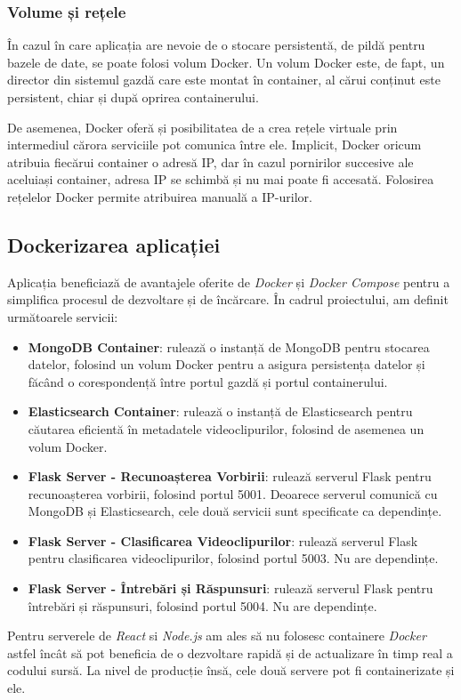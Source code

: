 \subsubsection{Volume și rețele}
\par
În cazul în care aplicația are nevoie de o stocare persistentă, de pildă pentru bazele de date, se poate
folosi volum Docker. Un volum Docker este, de fapt, un director din sistemul gazdă care este montat în
container, al cărui conținut este persistent, chiar și după oprirea containerului.

\par
De asemenea, Docker oferă și posibilitatea de a crea rețele virtuale prin intermediul cărora serviciile
pot comunica între ele. Implicit, Docker oricum atribuia fiecărui container o adresă IP, dar în cazul
pornirilor succesive ale aceluiași container, adresa IP se schimbă și nu mai poate fi accesată. Folosirea
rețelelor Docker permite atribuirea manuală a IP-urilor.

\subsection{Dockerizarea aplicației}
\par
Aplicația beneficiază de avantajele oferite de \textit{Docker} și \textit{Docker Compose} pentru a simplifica procesul
de dezvoltare și de încărcare. În cadrul proiectului, am definit următoarele servicii:

\begin{itemize}
    \item \textbf{MongoDB Container}: rulează o instanță de MongoDB pentru stocarea datelor, folosind
    un volum Docker pentru a asigura persistența datelor și făcând o corespondență între portul gazdă
    și portul containerului.
    \item \textbf{Elasticsearch Container}: rulează o instanță de Elasticsearch pentru căutarea eficientă
    în metadatele videoclipurilor, folosind de asemenea un volum Docker.
    \item \textbf{Flask Server - Recunoașterea Vorbirii}: rulează serverul Flask pentru recunoașterea
    vorbirii, folosind portul 5001. Deoarece serverul comunică cu MongoDB și Elasticsearch, cele două
    servicii sunt specificate ca dependințe.
    \item \textbf{Flask Server - Clasificarea Videoclipurilor}: rulează serverul Flask pentru clasificarea
    videoclipurilor, folosind portul 5003. Nu are dependințe.
    \item \textbf{Flask Server - Întrebări și Răspunsuri}: rulează serverul Flask pentru întrebări și
    răspunsuri, folosind portul 5004. Nu are dependințe.
\end{itemize}

\par
Pentru serverele de \textit{React} si \textit{Node.js} am ales să nu folosesc containere \textit{Docker}
astfel încât să pot beneficia de o dezvoltare rapidă și de actualizare în timp real a codului sursă. La
nivel de producție însă, cele două servere pot fi containerizate și ele.

